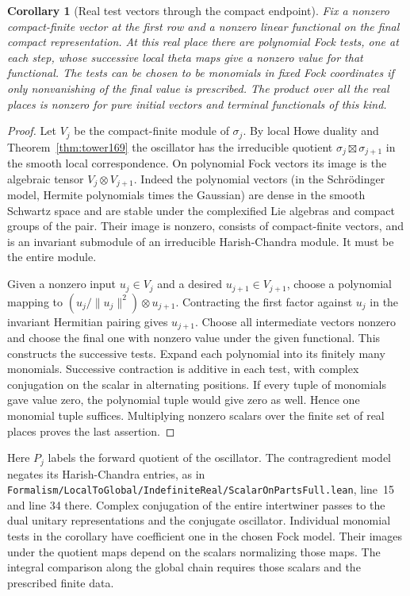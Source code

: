 \documentclass[a4paper,11pt]{article}
\newtheorem{corollary}[proposition]{Corollary}
\theoremstyle{definition}
\theoremstyle{remark}
\newcommand{\srcloc}[2]{{\small\nolinkurl{#1.lean}}, line~#2}
\numberwithin{equation}{section}
\begin{document}
\begin{corollary}[Real test vectors through the compact endpoint]
\label{cor:vectors169}
Fix a nonzero compact-finite vector at the first row and a
nonzero linear functional on the final compact representation.
At this real place there are polynomial Fock tests, one at
each step, whose successive local theta maps give a nonzero
value for that functional. The tests can be chosen to be
monomials in fixed Fock coordinates if only nonvanishing of
the final value is prescribed. The product over all the
real places is nonzero for pure initial vectors and terminal
functionals of this kind.
\end{corollary}
\begin{proof}
Let \(V_j\) be the compact-finite module of \(\sigma_j\).
By local Howe duality and Theorem~\ref{thm:tower169} the
oscillator has the irreducible quotient
\(\sigma_j\boxtimes\sigma_{j+1}\) in the smooth local
correspondence. On polynomial Fock vectors its image is the
algebraic tensor \(V_j\otimes V_{j+1}\).
Indeed the polynomial vectors (in the Schr\"odinger model,
Hermite polynomials times the Gaussian) are dense in the
smooth Schwartz space and are stable under the complexified
Lie algebras and compact groups of the pair. Their image
is nonzero, consists of compact-finite vectors, and is an
invariant submodule of an irreducible Harish-Chandra module.
It must be the entire module.

Given a nonzero input \(u_j\in V_j\) and a desired
\(u_{j+1}\in V_{j+1}\), choose a polynomial mapping to
\((u_j/\|u_j\|^2)\otimes u_{j+1}\). Contracting the first
factor against \(u_j\) in the invariant Hermitian pairing
gives \(u_{j+1}\). Choose all intermediate vectors nonzero
and choose the final one with nonzero value under the
given functional. This constructs the successive tests.
Expand each polynomial into its finitely many monomials.
Successive contraction is additive in each test, with complex
conjugation on the scalar in alternating positions. If every
tuple of monomials gave value zero, the polynomial tuple
would give zero as well. Hence one monomial tuple suffices.
Multiplying nonzero scalars over the finite set of real
places proves the last assertion.
\end{proof}

Here \(P_j\) labels the forward quotient of the oscillator.
The contragredient model negates its Harish-Chandra entries,
as in \srcloc{Formalism/LocalToGlobal/IndefiniteReal/ScalarOnPartsFull}{15}
and line 34 there. Complex conjugation of the entire
intertwiner passes to the dual unitary representations and
the conjugate oscillator. Individual monomial tests in the
corollary have coefficient one in the chosen Fock model.
Their images under the quotient maps depend on the scalars
normalizing those maps. The integral comparison along the
global chain requires those scalars and the prescribed finite
data.
\end{document}
